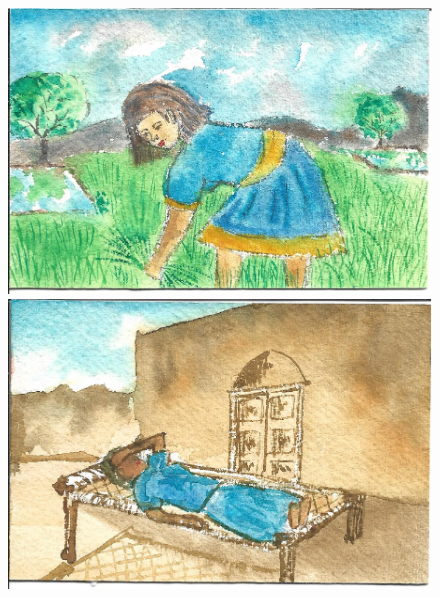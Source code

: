 \documentclass[12pt]{article}
\begin{document}
\begin{figure}[h!]
\centering
\includegraphics[width=.331\paperwidth]{pictures/LW}
\hspace*{1cm}\includegraphics[width=.331\paperwidth]{pictures/LR}

\vspace*{1cm}


\end{figure}
\end{document}
